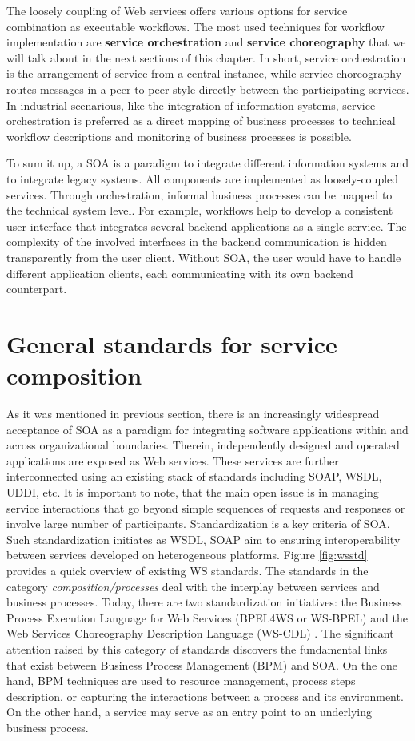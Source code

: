 The loosely coupling of Web services offers various options for service combination as executable workflows. The most used techniques for workflow implementation are \textbf{service orchestration} and \textbf{service choreography} that we will talk about in the next sections of this chapter.  In short, service orchestration is the arrangement of service from a central instance, while service choreography routes messages in a peer-to-peer style directly between the participating services. In industrial scenarious, like the integration of information systems, service orchestration is preferred as a direct mapping of business processes to technical workflow descriptions and monitoring of business processes is possible.

To sum it up, a SOA is a paradigm to integrate different information systems and to integrate legacy systems. All components are implemented as loosely-coupled services. Through orchestration, informal business processes can be mapped to the technical system level. For example, workflows help to develop a consistent user interface that integrates several backend applications as a single service. The complexity of the involved interfaces in the backend communication is hidden transparently from the user client. Without SOA, the user would have to handle different application clients, each communicating with its own backend counterpart.

\section{General standards for service composition}

As it was mentioned in previous section, there is an increasingly widespread acceptance of SOA as a paradigm for integrating software applications within and across organizational boundaries. Therein, independently designed and operated applications are exposed as Web services. These services are further interconnected using an existing stack of standards including SOAP, WSDL, UDDI, etc. It is important to note, that the main open issue is in managing service interactions that go beyond simple sequences of requests and responses or involve large number of participants. Standardization is a key criteria of SOA. Such standardization initiates as WSDL, SOAP aim to ensuring interoperability between services developed on heterogeneous platforms. Figure \ref{fig:wsstd} provides a quick overview of existing WS standards. The standards in the category \textit{composition/processes} deal with the interplay between services and business processes. Today, there are two standardization initiatives: the Business Process Execution Language for Web Services (BPEL4WS or WS-BPEL) \cite{soaatoi} and the Web Services Choreography Description Language (WS-CDL) \cite{osw}. The significant attention raised by this category of standards discovers the fundamental links that exist between Business Process Management (BPM) and SOA. On the one hand, BPM techniques are used to resource management, process steps description, or capturing the interactions between a process and its environment. On the other hand, a service may serve as an entry point to an underlying business process.

